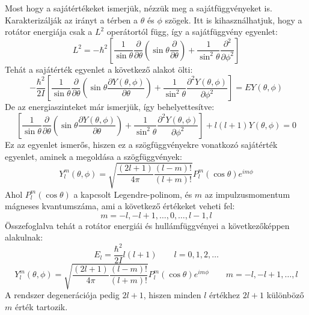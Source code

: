 \documentclass[../main.tex]{subfiles}
\begin{document}
Most hogy a sajátértékeket ismerjük, nézzük meg a sajátfüggvényeket is. Karakterizálják az irányt a térben a $\theta$ és $\phi$ szögek.
Itt is kihasználhatjuk, hogy a rotátor energiája csak a $L^2$ operátortól függ, így a sajátfüggvény egyenlet:
\begin{equation}
    L^2 = - \hbar^2 \left[ \frac{1}{\sin \theta} \frac{\partial}{\partial \theta} \left( \sin \theta \frac{\partial}{\partial \theta} \right) + \frac{1}{\sin^2 \theta} \frac{\partial^2}{\partial \phi^2} \right]
\end{equation}
Tehát a sajátérték egyenlet a következő alakot ölti:
\begin{equation}
    - \frac{\hbar^2}{2I} \left[ \frac{1}{\sin \theta} \frac{\partial}{\partial \theta} \left( \sin \theta \frac{\partial Y(\theta, \phi)}{\partial \theta} \right) + \frac{1}{\sin^2 \theta} \frac{\partial^2 Y(\theta, \phi)}{\partial \phi^2} \right] = E Y(\theta, \phi)
\end{equation}
De az energiaszinteket már ismerjük, így behelyettesítve:
\begin{equation}
    \left[ \frac{1}{\sin \theta} \frac{\partial}{\partial \theta} \left( \sin \theta \frac{\partial Y(\theta, \phi)}{\partial \theta} \right) + \frac{1}{\sin^2 \theta} \frac{\partial^2 Y(\theta, \phi)}{\partial \phi^2} \right] + l (l + 1) Y(\theta, \phi) = 0
\end{equation}
Ez az egyenlet ismerős, hiszen ez a szögfüggvényekre vonatkozó sajátérték egyenlet, aminek a megoldása a szögfüggvények:
\begin{equation}
    Y_{l}^{m}(\theta, \phi) = \sqrt{\frac{(2l + 1)}{4 \pi} \frac{(l - m)!}{(l + m)!}} P_{l}^{m}(\cos \theta) e^{i m \phi}
\end{equation}
Ahol $P_{l}^{m}(\cos \theta)$ a kapcsolt Legendre-polinom, és $m$ az impulzusmomentum mágneses kvantumszáma, ami a következő értékeket veheti fel:
\begin{equation}
    m = -l, -l + 1, \ldots, 0, \ldots, l - 1, l
\end{equation}
Összefoglalva tehát a rotátor energiái és hullámfüggvényei a következőképpen alakulnak:
\begin{equation}
    E_l = \frac{\hbar^2}{2I} l (l + 1) \quad \quad l = 0, 1, 2, \ldots
\end{equation}
\begin{equation}
    Y_{l}^{m}(\theta, \phi) = \sqrt{\frac{(2l + 1)}{4 \pi} \frac{(l - m)!}{(l + m)!}} P_{l}^{m}(\cos \theta) e^{i m \phi} \quad \quad m = -l, -l + 1, \ldots, l
\end{equation}
A rendszer degenerációja pedig $2l + 1$, hiszen minden $l$ értékhez $2l + 1$ különböző $m$ érték tartozik.
\end{document}
